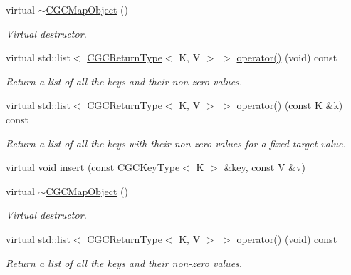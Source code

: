 \begin{DoxyCompactItemize}
\item 
virtual \mbox{\hyperlink{classHadron_1_1CGCMapObject_aee79d26f143bad748680b674763b831f}{$\sim$\+C\+G\+C\+Map\+Object}} ()
\begin{DoxyCompactList}\small\item\em Virtual destructor. \end{DoxyCompactList}\item 
virtual std\+::list$<$ \mbox{\hyperlink{structHadron_1_1CGCReturnType}{C\+G\+C\+Return\+Type}}$<$ K, V $>$ $>$ \mbox{\hyperlink{classHadron_1_1CGCMapObject_aaa4b18e1a2845e16154cd434462c0779}{operator()}} (void) const
\begin{DoxyCompactList}\small\item\em Return a list of all the keys and their non-\/zero values. \end{DoxyCompactList}\item 
virtual std\+::list$<$ \mbox{\hyperlink{structHadron_1_1CGCReturnType}{C\+G\+C\+Return\+Type}}$<$ K, V $>$ $>$ \mbox{\hyperlink{classHadron_1_1CGCMapObject_aeb342dc81f17743a25b969f540db4edf}{operator()}} (const K \&k) const
\begin{DoxyCompactList}\small\item\em Return a list of all the keys with their non-\/zero values for a fixed target value. \end{DoxyCompactList}\item 
virtual void \mbox{\hyperlink{classHadron_1_1CGCMapObject_a334a88a21755a64719b1081190d2bde2}{insert}} (const \mbox{\hyperlink{structHadron_1_1CGCKeyType}{C\+G\+C\+Key\+Type}}$<$ K $>$ \&key, const V \&\mbox{\hyperlink{hadron__timeslice_8cc_a716fc87f5e814be3ceee2405ed6ff22a}{v}})
\item 
virtual \mbox{\hyperlink{classHadron_1_1CGCMapObject_aee79d26f143bad748680b674763b831f}{$\sim$\+C\+G\+C\+Map\+Object}} ()
\begin{DoxyCompactList}\small\item\em Virtual destructor. \end{DoxyCompactList}\item 
virtual std\+::list$<$ \mbox{\hyperlink{structHadron_1_1CGCReturnType}{C\+G\+C\+Return\+Type}}$<$ K, V $>$ $>$ \mbox{\hyperlink{classHadron_1_1CGCMapObject_aaa4b18e1a2845e16154cd434462c0779}{operator()}} (void) const
\begin{DoxyCompactList}\small\item\em Return a list of all the keys and their non-\/zero values. \end{DoxyCompactList}\item 

\end{DoxyCompactItemize}
